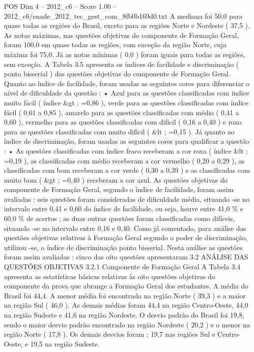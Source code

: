 \begin{textsample}{POS Dim 4 – 2012\_c6 – Score 1.00 – 2012\_c6/enade\_2012\_tec\_gest\_com\_8fb0b169d0.txt}
A mediana foi 50,0 para quase todas as regiões do Brasil, exceto para as regiões Norte e Nordeste ( 37,5 ).
As notas máximas, nas questões objetivas do componente de Formação Geral, foram 100,0 em quase todas as regiões, com exceção da região Norte, cuja máxima foi 75,0.
Já as notas mínimas ( 0,0 ) foram iguais para todas as regiões, sem exceção.
A Tabela 3.5 apresenta os índices de facilidade e discriminação ( ponto bisserial ) das questões objetivas do componente de Formação Geral.
Quanto ao índice de facilidade, foram usadas as seguintes cores para diferenciar o nível de dificuldade da questão : • Azul para as questões classificadas com índice muito fácil ( índice \&gt ; =0,86 ), verde para as questões classificadas com índice fácil ( 0,61 a 0,85 ), amarelo para as questões classificadas com médio ( 0,41 a 0,60 ), vermelho para as questões classificadas com difícil ( 0,16 a 0,40 ) e roxo para as questões classificadas com muito difícil ( \&lt ; =0,15 ).
Já quanto ao índice de discriminação, foram usadas as seguintes cores para qualificar a questão : • As questões classificadas com índice fraco receberam a cor roxa ( índice \&lt ; =0,19 ), as classificadas com médio receberam a cor vermelho ( 0,20 a 0,29 ), as classificadas com bom receberam a cor verde ( 0,30 a 0,39 ) e as classificadas com muito bom ( \&gt ; =0,40 ) receberam a cor azul.
As questões objetivas do componente de Formação Geral, segundo o índice de facilidade, foram assim avaliadas : seis questões foram consideradas de dificuldade média, situando -se no intervalo entre 0,41 e 0,60 do índice de facilidade, ou seja, houve entre 41,0 \% e 60,0 \% de acertos ; as duas outras questões foram classificadas como difíceis, situando -se no intervalo entre 0,16 e 0,40.
Como já comentado, para análise das questões objetivas relativas à Formação Geral segundo o poder de discriminação, utilizou -se, o índice de discriminação ponto bisserial.
Nesta análise as questões foram assim avaliadas : cinco das oito questões apresentaram 3.2 ANÁLISE DAS QUESTÕES OBJETIVAS 3.2.1 Componente de Formação Geral A Tabela 3.4 apresenta as estatísticas básicas relativas às oito questões objetivas do componente da prova que abrange a Formação Geral dos estudantes.
A média do Brasil foi 44,4.
A menor média foi encontrada na região Norte ( 39,3 ) e a maior na região Sul ( 46,0 ).
As demais médias foram 44,4 na região Centro-Oeste, 44,0 na região Sudeste e 41,6 na região Nordeste.
O desvio padrão do Brasil foi 19,8, sendo o maior desvio padrão encontrado na região Nordeste ( 20,2 ) e o menor na região Norte ( 17,8 ).
Os demais desvios foram : 19,7 nas regiões Sul e Centro-Oeste, e 19,5 na região Sudeste.

\end{textsample}
